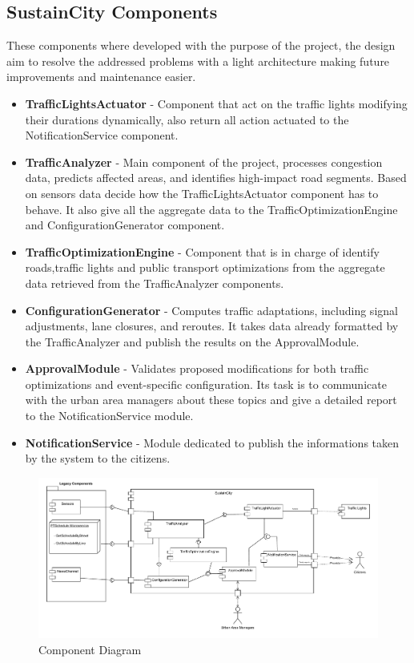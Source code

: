 \documentclass[a4paper,12pt]{article}
\begin{document}
\subsection*{SustainCity Components}
These components where developed with the purpose of the project, the design aim to resolve the addressed problems with a light architecture making future improvements and maintenance easier.  
\begin{itemize}
    \item \textbf{TrafficLightsActuator} - Component that act on the traffic lights modifying their durations dynamically, also return all action actuated to the NotificationService component.
    \item \textbf{TrafficAnalyzer} - Main component of the project, processes congestion data, predicts affected areas,
    and identifies high-impact road segments.
    Based on sensors data decide how the TrafficLightsActuator component has to behave.
    It also give all the aggregate data to the TrafficOptimizationEngine and ConfigurationGenerator component.
    \item \textbf{TrafficOptimizationEngine} - Component that is in charge of identify roads,traffic lights and public transport optimizations from the aggregate data retrieved from the TrafficAnalyzer components. 
    \item \textbf{ConfigurationGenerator} - Computes traffic adaptations, including signal adjustments, lane closures, and reroutes. It takes data already formatted by the TrafficAnalyzer and publish the results on the ApprovalModule.
    \item \textbf{ApprovalModule} - Validates proposed modifications for both traffic optimizations and event-specific configuration. 
    \newline Its task is to communicate with the urban area managers about these topics and give a detailed report to the NotificationService module. 
    \item \textbf{NotificationService} - Module dedicated to publish the informations taken by the system to the citizens.
\end{itemize}
\begin{figure}[h]
    \centering
    \includegraphics[width=1.1\textwidth]{diagrams/ComponentDiagram1.pdf}
    \caption{Component Diagram}
    \label{fig:ComponentDiagram.drawio}
\end{figure}
\end{document}
